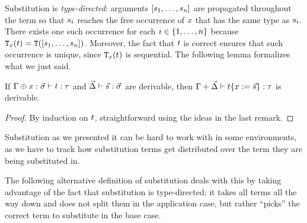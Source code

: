 \begin{remark}
Substitution is {\em type-directed}: arguments $[s_1,\hdots,s_n]$
are propagated throughout the term
so that $s_i$ reaches the free occurrence of $x$
that has the same type as $s_i$.
There exists one such occurrence for each $i \in \{1, \hdots, n\}$ because
$\mathtt{T}_{x}(t) = \mathtt{T}([s_1,\hdots,s_n])$.
Moreover, the fact that $t$ is correct ensures that such occurrence is unique,
since $\mathtt{T}_{x}(t)$ is sequential.
The following lemma formalizes what we just said.
\end{remark}


\begin{lemma}
If $\Gamma \oplus x : \vec{\sigma} \vdash t : \tau$
and $\vec{\Delta} \vdash \vec{s} : \vec{\sigma}$
are derivable,
then $\Gamma + \vec{\Delta} \vdash t\{x := \vec{s}\} : \tau$
is derivable.
\end{lemma}
\begin{proof}
By induction on $t$, straightforward using the ideas in the last remark.
\end{proof}

Substitution as we presented it can be hard to work with in some environments,
as we have to track how substitution terms get distributed over the term they are
being substituted in.

The following alternative definition of substitution deals with this by
taking advantage of the fact that substitution is type-directed: it
takes all terms all the way down and does not split them in the application case, but rather
``picks'' the correct term to substitute in the base case.

